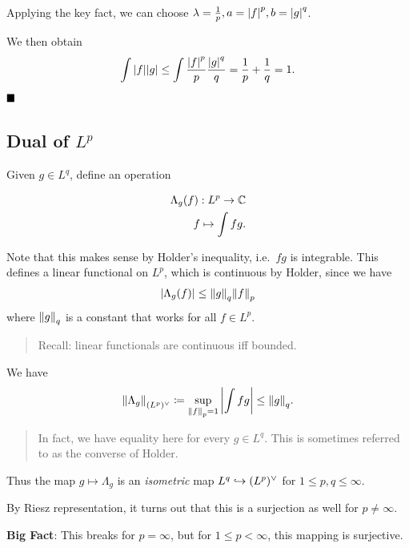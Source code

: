 Applying the key fact, we can choose
\(\lambda = \frac 1 p, a ={\left\lvert {f} \right\rvert}^p, b = {\left\lvert {g} \right\rvert}^q\).

We then obtain
\begin{align*}
\int {\left\lvert {f} \right\rvert} {\left\lvert {g} \right\rvert} \leq \int \frac{{\left\lvert {f} \right\rvert}^p}{p} \frac{{\left\lvert {g} \right\rvert}^q}{q} = \frac 1 p + \frac 1 q = 1.
\end{align*} \(\qed\)

\hypertarget{dual-of-lp}{%
\subsection{\texorpdfstring{Dual of
\(L^p\)}{Dual of L\^{}p}}\label{dual-of-lp}}

Given \(g\in L^q\), define an operation

\begin{align*}
\Lambda_g(f): L^p \to {\mathbb{C}} \\
f \mapsto \int f g
.\end{align*}

Note that this makes sense by Holder's inequality, i.e.~\(fg\) is
integrable. This defines a linear functional on \(L^p\), which is
continuous by Holder, since we have
\begin{align*}
{\left\lvert {\Lambda_g(f)} \right\rvert} \leq {\left\lVert {g} \right\rVert}_q {\left\lVert {f} \right\rVert}_p
\end{align*} where \({\left\lVert {g} \right\rVert}_q\) is a constant that works for all
\(f \in L^p\).

\begin{quote}
Recall: linear functionals are continuous iff bounded.
\end{quote}

We have
\begin{align*}
{\left\lVert {\Lambda_g} \right\rVert}_{(L^p)^\vee} \coloneqq \sup_{{\left\lVert {f} \right\rVert}_p = 1} {\left\lvert {\int fg} \right\rvert} \leq {\left\lVert {g} \right\rVert}_q
.\end{align*}

\begin{quote}
In fact, we have equality here for every \(g\in L^q\). This is sometimes
referred to as the converse of Holder.
\end{quote}

Thus the map \(g \mapsto \Lambda_g\) is an \emph{isometric} map
\(L^q \hookrightarrow (L^p)^\vee\) for \(1 \leq p,q \leq \infty\).

By Riesz representation, it turns out that this is a surjection as well
for \(p\neq \infty\).

\textbf{Big Fact}: This breaks for \(p=\infty\), but for
\(1 \leq p < \infty\), this mapping is surjective.

